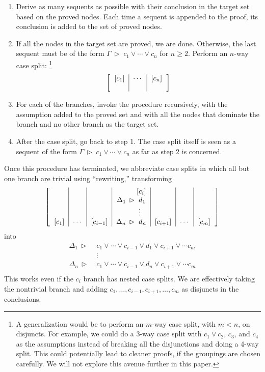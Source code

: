 \documentclass[withtimes,a4paper,12pt]{easychair}
\newcommand\have{\mathrel{\,\vartriangleright\;}}
\begin{document}
\begin{enumerate}
\item Derive as many sequents as possible with their conclusion in the target set
based on the proved nodes. Each time a sequent is appended to the proof, its
conclusion is added to the set of proved nodes.

\item If all the nodes in the target set are proved, we are done. Otherwise, the
last sequent must be of the form $\Gamma \have c_1 \lor \cdots \lor c_n$ for $n
\ge 2$. Perform an $n$-way case split:%
\footnote{A generalization would be to perform an $m$-way case split, with $m <
n$, on disjuncts. For example, we could do a 3-way case split with $c_1 \lor
c_2$, $c_3$, and $c_4$ as the assumptions instead of breaking all the
disjunctions and doing a 4-way split. This could potentially lead to cleaner
proofs, if the groupings are chosen carefully. We will not explore this avenue
further in this paper.}
\[
\left[\begin{tabular}{c|c|c}
$[c_1]$ & $\cdots$ & $[c_n]$ \\
 & & 
\end{tabular}
\right]
\]

\item For each of the branches, invoke the procedure recursively, with the
assumption added to the proved set and with all the nodes that dominate the
branch and no other branch as the target set.

\item After the case split, go back to step 1. The case split itself is seen as
a sequent of the form $\Gamma \have c_1 \lor \cdots \lor c_n$ as far as step 2
is concerned.
\end{enumerate}

Once this procedure has terminated, we abbreviate case splits in which all
but one branch are trivial using ``rewriting,'' transforming
\[
\left[\begin{tabular}{c|c|c|r@{}l|c|c|c}
&&& $[$ & $c_i]$ &&& \\
&&& $\Delta_1 \have {}$ & $d_1$ &&& \\
&&&& $\vdots$ &&& \\
$[c_1]$ & $\cdots$ & $[c_{i-1}]$ & $\Delta_n \have {}$ & $d_n$ & $[c_{i+1}]$ & $\cdots$ & $[c_m]$
\end{tabular}
\right]
\]
into
\begin{align*}
\Delta_1 \have {} & c_1 \lor \cdots \lor c_{i-1} \lor d_1 \lor c_{i+1} \lor \cdots c_m \\
& \vdots \\
\Delta_n \have {} & c_1 \lor \cdots \lor c_{i-1} \lor d_n \lor c_{i+1} \lor \cdots c_m \\
\end{align*}
This works even if the $c_i$ branch has nested case splits. We are effectively
taking the nontrivial branch and adding $c_1, \ldots, c_{i-1}, c_{i+1}, \ldots,
c_m$ as disjuncts in the conclusions.
\end{document}
